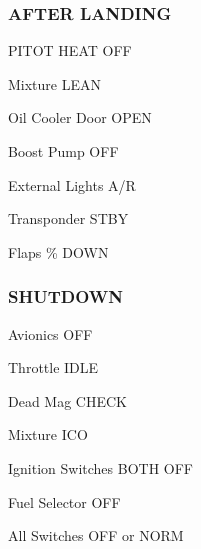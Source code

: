 \begin{multicols}{2}
\subsubsection*{AFTER LANDING}
\begin{enumerate*}
\item PITOT HEAT \dotfill OFF
\item Mixture \dotfill LEAN
\item Oil Cooler Door \dotfill OPEN
\item Boost Pump \dotfill OFF
\item External Lights \dotfill A/R
\item Transponder \dotfill STBY
\item Flaps \% DOWN
\end{enumerate*}

\subsubsection*{SHUTDOWN}
\begin{enumerate*}
\item Avionics \dotfill OFF
\item Throttle \dotfill IDLE
\item Dead Mag \dotfill CHECK
\item Mixture \dotfill ICO
\item Ignition Switches \dotfill BOTH OFF
\item Fuel Selector \dotfill OFF
\item All Switches \dotfill OFF or NORM
\end{enumerate*}
\end{multicols}

\cleardoublepage
\ohead{\leftmark} %
\chead{} %

